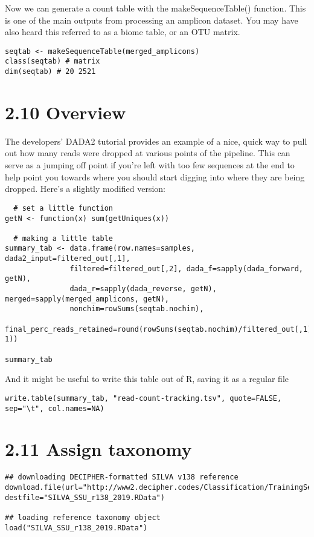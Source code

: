 \documentclass[
]{book}
\begin{document}
Now we can generate a count table with the makeSequenceTable() function. This is one of the main outputs from processing an amplicon dataset. You may have also heard this referred to as a biome table, or an OTU matrix.

\begin{verbatim}
seqtab <- makeSequenceTable(merged_amplicons)
class(seqtab) # matrix
dim(seqtab) # 20 2521
\end{verbatim}

\hypertarget{overview}{%
\section{2.10 Overview}\label{overview}}

The developers' DADA2 tutorial provides an example of a nice, quick way to pull out how many reads were dropped at various points of the pipeline. This can serve as a jumping off point if you're left with too few sequences at the end to help point you towards where you should start digging into where they are being dropped. Here's a slightly modified version:

\begin{verbatim}
  # set a little function
getN <- function(x) sum(getUniques(x))

  # making a little table
summary_tab <- data.frame(row.names=samples, dada2_input=filtered_out[,1],
               filtered=filtered_out[,2], dada_f=sapply(dada_forward, getN),
               dada_r=sapply(dada_reverse, getN), merged=sapply(merged_amplicons, getN),
               nonchim=rowSums(seqtab.nochim),
               final_perc_reads_retained=round(rowSums(seqtab.nochim)/filtered_out[,1]*100, 1))

summary_tab
\end{verbatim}

And it might be useful to write this table out of R, saving it as a regular file

\begin{verbatim}
write.table(summary_tab, "read-count-tracking.tsv", quote=FALSE, sep="\t", col.names=NA)
\end{verbatim}

\hypertarget{assign-taxonomy}{%
\section{2.11 Assign taxonomy}\label{assign-taxonomy}}

\begin{verbatim}
## downloading DECIPHER-formatted SILVA v138 reference
download.file(url="http://www2.decipher.codes/Classification/TrainingSets/SILVA_SSU_r138_2019.RData", destfile="SILVA_SSU_r138_2019.RData")

## loading reference taxonomy object
load("SILVA_SSU_r138_2019.RData")
\end{verbatim}
\end{document}
